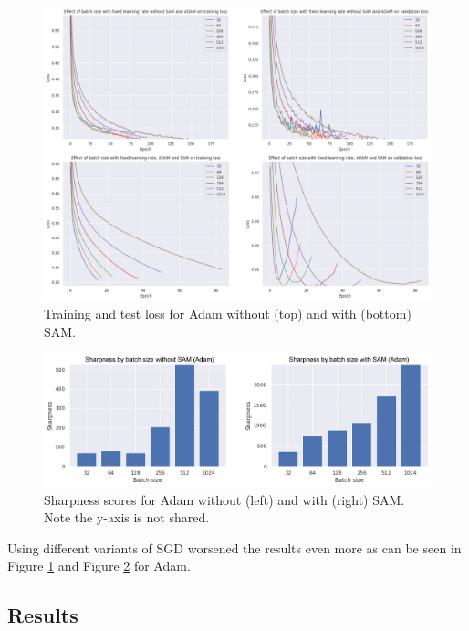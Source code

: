 \documentclass[10pt,conference,compsocconf]{IEEEtran}
\begin{document}
\begin{figure}[tbp]
  \centering
  \includegraphics[width=\columnwidth]{img/figure3_val_loss_with_without_sam_adam}
  \caption{Training and test loss for Adam without (top) and with (bottom) SAM.}
  \vspace{-3mm}
  \label{fig:adam-val-loss-with-without}
\end{figure}
\begin{figure}[tbp]
  \centering
  \includegraphics[width=\columnwidth]{img/figure4_sharpness_with_without_sam_adam}
  \caption{Sharpness scores for Adam without (left) and with (right) SAM. Note the y-axis is not shared.}
  \vspace{-3mm}
  \label{fig:adam-sharpness-with-without}
\end{figure}
Using different variants of SGD worsened the results even more as can be seen in Figure \ref{fig:adam-val-loss-with-without} and Figure \ref{fig:adam-sharpness-with-without} for Adam.


\subsection{Results}
\end{document}
